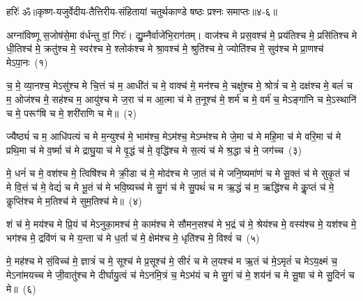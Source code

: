 {\anuvakamend[{घा॒सिं कश॑या तपद्र॒यिं नव॑ च}]}%

{हरिः॑ ॐ}{॥कृष्ण-यजुर्वेदीय-तैत्तिरीय-संहितायां चतुर्थकाण्डे षष्ठः प्रश्नः समाप्तः॥४-६॥}

\setcounter{anuvakam}{0}
अग्ना॑विष्णू स॒जोष॑से॒मा व॑र्धन्तु वां॒ गिरः॑। द्यु॒म्नैर्वाजे॑भि॒राग॑तम्। वाज॑श्च मे प्रस॒वश्च॑ मे॒ प्रय॑तिश्च मे॒ प्रसि॑तिश्च मे धी॒तिश्च॑ मे॒ क्रतु॑श्च मे॒ स्वर॑श्च मे॒ श्लोक॑श्च मे श्रा॒वश्च॑ मे॒ श्रुति॑श्च मे॒ ज्योति॑श्च मे॒ सुव॑श्च मे प्रा॒णश्च॑ मे\-ऽपा॒नः~(१)

च॒ मे॒ व्या॒नश्च॒ मे\-ऽसु॑श्च मे चि॒त्तं च॑ म॒ आधी॑तं च मे॒ वाक्च॑ मे॒ मन॑श्च मे॒ चक्षु॑श्च मे॒ श्रोत्रं॑ च मे॒ दक्ष॑श्च मे॒ बलं॑ च म॒ ओज॑श्च मे॒ सह॑श्च म॒ आयु॑श्च मे ज॒रा च॑ म आ॒त्मा च॑ मे त॒नूश्च॑ मे॒ शर्म॑ च मे॒ वर्म॑ च॒ मे\-ऽङ्गा॑नि च मे॒\-ऽस्थानि॑ च मे॒ परूꣳ॑षि च मे॒ शरी॑राणि च मे॥~(२)

{\anuvakamend[{अ॒पा॒नस्त॒नूश्च॑ मे॒\-ऽष्टाद॑श च}]}%

ज्यैष्ठ्यं॑ च म॒ आधि॑पत्यं च मे म॒न्युश्च॑ मे॒ भाम॑श्च॒ मे\-ऽम॑श्च॒ मे\-ऽम्भ॑श्च मे जे॒मा च॑ मे महि॒मा च॑ मे वरि॒मा च॑ मे प्रथि॒मा च॑ मे व॒र्ष्मा च॑ मे द्राघु॒या च॑ मे वृ॒द्धं च॑ मे॒ वृद्धि॑श्च मे स॒त्यं च॑ मे श्र॒द्धा च॑ मे॒ जग॑च्च~(३)

मे॒ धनं॑ च मे॒ वश॑श्च मे॒ त्विषि॑श्च मे क्री॒डा च॑ मे॒ मोद॑श्च मे जा॒तं च॑ मे जनि॒ष्यमा॑णं च मे सू॒क्तं च॑ मे सुकृ॒तं च॑ मे वि॒त्तं च॑ मे॒ वेद्यं॑ च मे भू॒तं च॑ मे भवि॒ष्यच्च॑ मे सु॒गं च॑ मे सु॒पथं॑ च म ऋ॒द्धं च॑ म॒ ऋद्धि॑श्च मे कॢ॒प्तं च॑ मे॒ कॢप्ति॑श्च मे म॒तिश्च॑ मे सुम॒तिश्च॑ मे॥~(४)

{\anuvakamend[{जग॒च्चर्द्धि॒श्चतु॑र्दश च}]}%

शं च॑ मे॒ मय॑श्च मे प्रि॒यं च॑ मे\-ऽनुका॒मश्च॑ मे॒ काम॑श्च मे सौमन॒सश्च॑ मे भ॒द्रं च॑ मे॒ श्रेय॑श्च मे॒ वस्य॑श्च मे॒ यश॑श्च मे॒ भग॑श्च मे॒ द्रवि॑णं च मे य॒न्ता च॑ मे ध॒र्ता च॑ मे॒ क्षेम॑श्च मे॒ धृति॑श्च मे॒ विश्वं॑ च~(५)

मे॒ मह॑श्च मे सं॒विच्च॑ मे॒ ज्ञात्रं॑ च मे॒ सूश्च॑ मे प्र॒सूश्च॑ मे॒ सीरं॑ च मे ल॒यश्च॑ म ऋ॒तं च॑ मे॒\-ऽमृतं॑ च मे\-ऽय॒क्ष्मं च॒ मे\-ऽना॑मयच्च मे जी॒वातु॑श्च मे दीर्घायु॒त्वं च॑ मे\-ऽनमि॒त्रं च॒ मे\-ऽभ॑यं च मे सु॒गं च॑ मे॒ शय॑नं च मे सू॒षा च॑ मे सु॒दिनं॑ च मे॥~(६)

